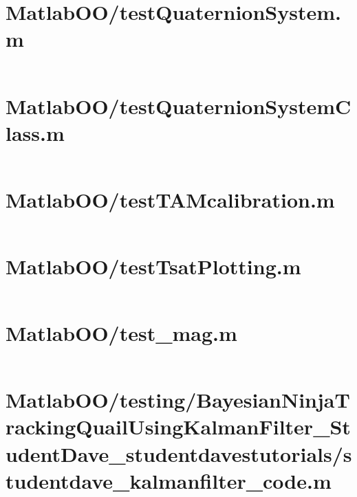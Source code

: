\pagebreak
\section*{MatlabOO/testQuaternionSystem.m}\label{code:MatlabOO/testQuaternionSystem.m}
\inputminted[linenos,fontsize=\scriptsize]{matlab}{/home/dcouture/git/mathyourlife/TSatPy/beta_versions/matlab_object_oriented/testQuaternionSystem.m}

\pagebreak
\section*{MatlabOO/testQuaternionSystemClass.m}\label{code:MatlabOO/testQuaternionSystemClass.m}
\inputminted[linenos,fontsize=\scriptsize]{matlab}{/home/dcouture/git/mathyourlife/TSatPy/beta_versions/matlab_object_oriented/testQuaternionSystemClass.m}

\pagebreak
\section*{MatlabOO/testTAMcalibration.m}\label{code:MatlabOO/testTAMcalibration.m}
\inputminted[linenos,fontsize=\scriptsize]{matlab}{/home/dcouture/git/mathyourlife/TSatPy/beta_versions/matlab_object_oriented/testTAMcalibration.m}

\pagebreak
\section*{MatlabOO/testTsatPlotting.m}\label{code:MatlabOO/testTsatPlotting.m}
\inputminted[linenos,fontsize=\scriptsize]{matlab}{/home/dcouture/git/mathyourlife/TSatPy/beta_versions/matlab_object_oriented/testTsatPlotting.m}

\pagebreak
\section*{MatlabOO/test\_mag.m}\label{code:MatlabOO/test_mag.m}
\inputminted[linenos,fontsize=\scriptsize]{matlab}{/home/dcouture/git/mathyourlife/TSatPy/beta_versions/matlab_object_oriented/test_mag.m}

\pagebreak
\section*{MatlabOO/testing/BayesianNinjaTrackingQuailUsingKalmanFilter\_StudentDave\_studentdavestutorials/studentdave\_kalmanfilter\_code.m}\label{code:MatlabOO/testing/BayesianNinjaTrackingQuailUsingKalmanFilter_StudentDave_studentdavestutorials/studentdave_kalmanfilter_code.m}
\inputminted[linenos,fontsize=\scriptsize]{matlab}{/home/dcouture/git/mathyourlife/TSatPy/beta_versions/matlab_object_oriented/testing/BayesianNinjaTrackingQuailUsingKalmanFilter_StudentDave_studentdavestutorials/studentdave_kalmanfilter_code.m}

